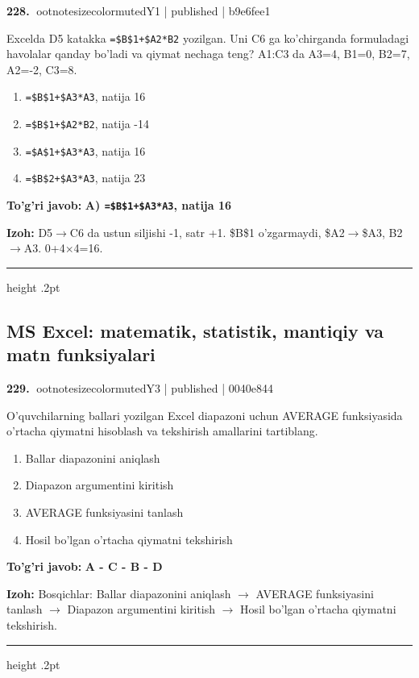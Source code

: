 \documentclass[10pt,a4paper]{article}
\begin{document}
\textbf{\color{ink}228.} {ootnotesizecolor{muted}Y1 | published | b9e6fee1}
\par
Excelda D5 katakka \texttt{=\$B\$1+\$A2*B2} yozilgan. Uni C6 ga ko'chirganda formuladagi havolalar qanday bo'ladi va qiymat nechaga teng? A1:C3 da A3=4, B1=0, B2=7, A2=-2, C3=8.
\begin{enumerate}[label=\Alph*),leftmargin=9mm]
\item \texttt{=\$B\$1+\$A3*A3}, natija 16
\item \texttt{=\$B\$1+\$A2*B2}, natija -14
\item \texttt{=\$A\$1+\$A3*A3}, natija 16
\item \texttt{=\$B\$2+\$A3*A3}, natija 23
\end{enumerate}
\begin{tcolorbox}[enhanced,breakable,colback=teal!4,colframe=teal!55!black,boxrule=0.45pt,arc=1.2mm,left=2.8mm,right=2.8mm,top=2mm,bottom=2mm]
\textbf{\color{teal}To'g'ri javob:} \textbf{A) \texttt{=\$B\$1+\$A3*A3}, natija 16}
\par\smallskip
\textbf{Izoh:} D5\ensuremath{\rightarrow}C6 da ustun siljishi -1, satr +1. \$B\$1 o'zgarmaydi, \$A2\ensuremath{\rightarrow}\$A3, B2\ensuremath{\rightarrow}A3. 0+4\ensuremath{\times}4=16.
\end{tcolorbox}
\vspace{2mm}\hrule height .2pt\vspace{2mm}
\subsection{MS Excel: matematik, statistik, mantiqiy va matn funksiyalari}

\textbf{\color{ink}229.} {ootnotesizecolor{muted}Y3 | published | 0040e844}
\par
O'quvchilarning ballari yozilgan Excel diapazoni uchun AVERAGE funksiyasida o'rtacha qiymatni hisoblash va tekshirish amallarini tartiblang.
\begin{enumerate}[label=\Alph*),leftmargin=9mm]
\item Ballar diapazonini aniqlash
\item Diapazon argumentini kiritish
\item AVERAGE funksiyasini tanlash
\item Hosil bo'lgan o'rtacha qiymatni tekshirish
\end{enumerate}
\begin{tcolorbox}[enhanced,breakable,colback=teal!4,colframe=teal!55!black,boxrule=0.45pt,arc=1.2mm,left=2.8mm,right=2.8mm,top=2mm,bottom=2mm]
\textbf{\color{teal}To'g'ri javob:} \textbf{A - C - B - D}
\par\smallskip
\textbf{Izoh:} Bosqichlar: Ballar diapazonini aniqlash \ensuremath{\rightarrow} AVERAGE funksiyasini tanlash \ensuremath{\rightarrow} Diapazon argumentini kiritish \ensuremath{\rightarrow} Hosil bo'lgan o'rtacha qiymatni tekshirish.
\end{tcolorbox}
\vspace{2mm}\hrule height .2pt\vspace{2mm}
\end{document}
